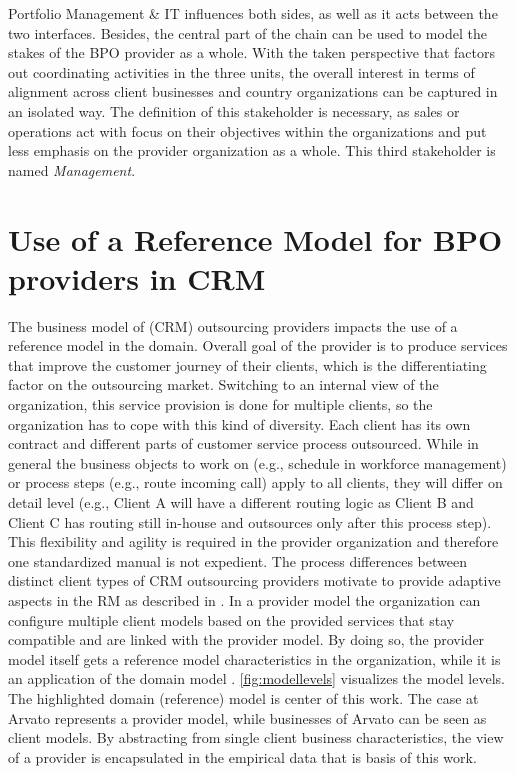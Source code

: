   Portfolio Management \& IT influences both sides, as well as it acts between the two interfaces. Besides, the central part of the chain can be used to model the stakes of the BPO provider as a whole. With the taken perspective that factors out coordinating activities in the three units, the overall interest in terms of alignment across client businesses and country organizations can be captured in an isolated way. The definition of this stakeholder is necessary, as sales or operations act with focus on their objectives within the organizations and put less emphasis on the provider organization as a whole. This third stakeholder is named \textit{Management}. 
  

\section{Use of a Reference Model for BPO providers in CRM}
\label{sec:refmodusearvato}
The business model of (CRM) outsourcing providers impacts the use of a reference model in the domain. Overall goal of the provider is to produce services that improve the customer journey of their clients, which is the differentiating factor on the outsourcing market. Switching to an internal view of the organization, this service provision is done for multiple clients, so the organization has to cope with this kind of diversity. Each client has its own contract and different parts of customer service process outsourced. While in general the business objects to work on (e.g., schedule in workforce management) or process steps (e.g., route incoming call) apply to all clients, they will differ on detail level (e.g., Client A will have a different routing logic as Client B and Client C has routing still in-house and outsources only after this process step). This flexibility and agility is required in the provider organization and therefore one standardized manual is not expedient. 
The process differences between distinct client types of CRM outsourcing providers motivate to provide adaptive aspects in the \acrshort{RM} as described in \citep{delfmann2006adaptive}. In a provider model the organization can configure multiple client models based on the provided services that stay compatible and are linked with the provider model. By doing so, the provider model itself gets a reference model characteristics in the organization, while it is an application of the domain model . \Fig \ref{fig:modellevels} visualizes the model levels. The highlighted domain (reference) model is center of this work. The case at Arvato represents a provider model, while businesses of Arvato can be seen as client models. By abstracting from single client business characteristics, the view of a provider is encapsulated in the empirical data that is basis of this work. 
